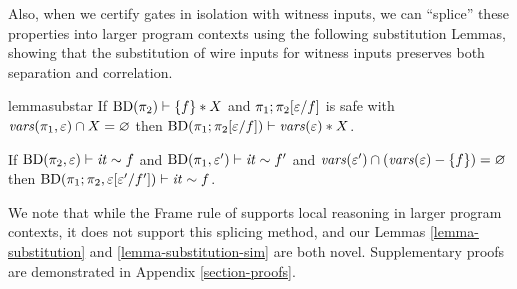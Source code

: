 Also, when we certify gates in isolation with witness inputs, we can
``splice'' these properties into larger program contexts using the
following substitution Lemmas, showing that the substitution of
wire inputs for witness inputs preserves both separation and correlation.
\begin{restatable}[Substitution$*$]{lemma}{substar}
  \label{lemma-substitution}
  If $\mathrm{BD}(\pi_2) \vdash \{ f \} * X$ and
  $\pi_1;\pi_2[\varepsilon/f]$ is safe with $\mathit{vars}(\pi_1,\varepsilon) \cap
  X = \varnothing$ then
  $\mathrm{BD}(\pi_1;\pi_2[\varepsilon/f]) \vdash \mathit{vars}(\varepsilon) * X$.
\end{restatable}

\begin{lemma}
  \label{lemma-substitution-sim}
  If $\mathrm{BD}(\pi_2,\varepsilon) \vdash \mathit{it} \sim f$ and $\mathrm{BD}(\pi_1,\varepsilon') \vdash \mathit{it} \sim f'$
  and $\mathit{vars}(\varepsilon') \cap (\mathit{vars}(\varepsilon) - \{ f \}) = \varnothing$
  then $\mathrm{BD}(\pi_1;\pi_2,\varepsilon[\varepsilon'/f']) \vdash \mathit{it} \sim f$.
\end{lemma}

We note that while the Frame rule of \cite{barthe2019probabilistic}
supports local reasoning in larger program contexts, it does not
support this splicing method, and our Lemmas \ref{lemma-substitution}
and \ref{lemma-substitution-sim} are both novel. Supplementary proofs
are demonstrated in Appendix \ref{section-proofs}.
